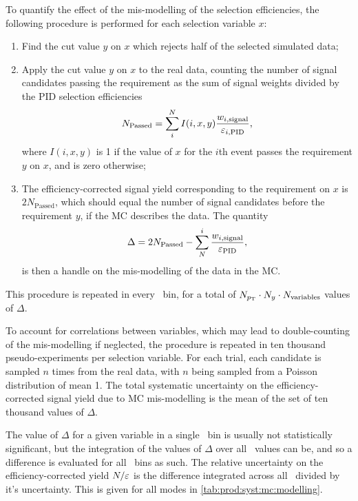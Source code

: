 To quantify the effect of the mis-modelling of the selection efficiencies, the 
following procedure is performed for each selection variable $x$:
\begin{enumerate}
  \item Find the cut value $y$ on $x$ which rejects half of the selected 
    simulated data;
  \item Apply the cut value $y$ on $x$ to the real data, counting the number of 
    signal candidates passing the requirement as the sum of signal weights 
    divided by the \ac{PID} selection efficiencies
    \begin{equation}
      N_{\text{Passed}} = \sum_{i}^{N} I(i, x, y) \frac{%
        w_{i,\text{signal}}
      }{%
        \eff_{i,\text{PID}}
      },
    \end{equation}
    where $I(i, x, y)$ is 1 if the value of $x$ for the $i$th event passes the 
    requirement $y$ on $x$, and is zero otherwise;
  \item The efficiency-corrected signal yield corresponding to the requirement 
    on $x$ is $2N_{\text{Passed}}$, which should equal the number of signal 
    candidates before the requirement $y$, if the \ac{MC} describes the data.  
    The quantity
    \begin{equation}
      \Delta = 2N_{\text{Passed}} - \sum_{N}^{i} \frac{w_{i,\text{signal}}}{\varepsilon_{\textnormal{PID}}},
      \label{eqn:prod:syst:mc:eff_diff}
    \end{equation}
    is then a handle on the mis-modelling of the data in the \ac{MC}.
\end{enumerate}
This procedure is repeated in every \pTy\ bin, for a total of $N_{p_{\textnormal{T}}} \cdot 
N_{y} \cdot N_{\text{variables}}$ values of $\Delta$.

To account for correlations between variables, which may lead to 
double-counting of the mis-modelling if neglected, the procedure is repeated 
in ten thousand pseudo-experiments per selection variable.
For each trial, each candidate is sampled $n$ times from the real data, with 
$n$ being sampled from a Poisson distribution of mean 1.
The total systematic uncertainty on the efficiency-corrected signal yield due 
to \ac{MC} mis-modelling is the mean of the set of ten thousand values of 
$\Delta$.

The value of $\Delta$ for a given variable in a single \pTy\ bin is usually not 
statistically significant, but the integration of the values of $\Delta$ over 
all \pTy\ values can be, and so a difference is evaluated for all \pTy\ bins as 
such.
The relative uncertainty on the efficiency-corrected yield $N/\varepsilon$ is the 
difference integrated across all \pTy\ divided by it's uncertainty.
This is given for all modes in \cref{tab:prod:syst:mc:modelling}.

